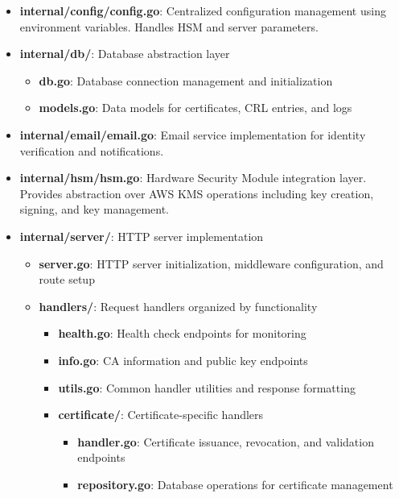 \begin{itemize}
    \item \textbf{internal/config/config.go}: Centralized configuration management using environment variables. Handles HSM and server parameters.
    
    \item \textbf{internal/db/}: Database abstraction layer
    \begin{itemize}
        \item \textbf{db.go}: Database connection management and initialization
        \item \textbf{models.go}: Data models for certificates, CRL entries, and logs
    \end{itemize}
    
    \item \textbf{internal/email/email.go}: Email service implementation for identity verification and notifications.
    
    \item \textbf{internal/hsm/hsm.go}: Hardware Security Module integration layer. Provides abstraction over AWS KMS operations including key creation, signing, and key management.
    
    \item \textbf{internal/server/}: HTTP server implementation
    \begin{itemize}
        \item \textbf{server.go}: HTTP server initialization, middleware configuration, and route setup
        \item \textbf{handlers/}: Request handlers organized by functionality
        \begin{itemize}
            \item \textbf{health.go}: Health check endpoints for monitoring
            \item \textbf{info.go}: CA information and public key endpoints
            \item \textbf{utils.go}: Common handler utilities and response formatting
            \item \textbf{certificate/}: Certificate-specific handlers
            \begin{itemize}
                \item \textbf{handler.go}: Certificate issuance, revocation, and validation endpoints
                \item \textbf{repository.go}: Database operations for certificate management
            \end{itemize}
        \end{itemize}
    \end{itemize}
\end{itemize}

